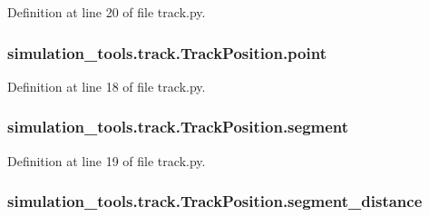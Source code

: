 Definition at line 20 of file track.\+py.

\subsubsection[{\texorpdfstring{point}{point}}]{\setlength{\rightskip}{0pt plus 5cm}simulation\+\_\+tools.\+track.\+Track\+Position.\+point}\hypertarget{classsimulation__tools_1_1track_1_1_track_position_a5c5ad2aecf6e00e6611e8ad70b38de7b}{}\label{classsimulation__tools_1_1track_1_1_track_position_a5c5ad2aecf6e00e6611e8ad70b38de7b}


Definition at line 18 of file track.\+py.

\subsubsection[{\texorpdfstring{segment}{segment}}]{\setlength{\rightskip}{0pt plus 5cm}simulation\+\_\+tools.\+track.\+Track\+Position.\+segment}\hypertarget{classsimulation__tools_1_1track_1_1_track_position_ab5feb6f2789576c88fe7310f28e4c4db}{}\label{classsimulation__tools_1_1track_1_1_track_position_ab5feb6f2789576c88fe7310f28e4c4db}


Definition at line 19 of file track.\+py.

\subsubsection[{\texorpdfstring{segment\+\_\+distance}{segment_distance}}]{\setlength{\rightskip}{0pt plus 5cm}simulation\+\_\+tools.\+track.\+Track\+Position.\+segment\+\_\+distance}\hypertarget{classsimulation__tools_1_1track_1_1_track_position_a89c184a72d3b1636bf9531de144374e4}{}\label{classsimulation__tools_1_1track_1_1_track_position_a89c184a72d3b1636bf9531de144374e4}


